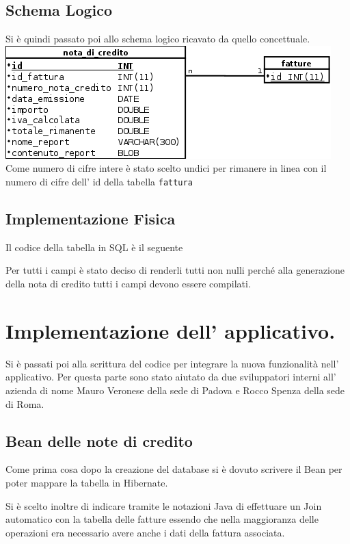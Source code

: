 \documentclass[12pt]{book}
\begin{document}
\subsection{Schema Logico}
Si è quindi passato poi allo schema logico ricavato da quello concettuale.
\newline
\newline
\includegraphics[scale=0.5]{img/schema_logico}
\newline
Come numero di cifre intere è stato scelto undici per rimanere in linea con il
numero di cifre dell' id della tabella \texttt{fattura}
\subsection{Implementazione Fisica}
Il codice della tabella in SQL è il seguente

Per tutti i campi è stato deciso di renderli tutti non nulli perché alla
generazione della nota di credito tutti i campi devono essere compilati.
\section{Implementazione dell' applicativo.}
Si è passati poi alla scrittura del codice per integrare la nuova funzionalità
nell' applicativo.
Per questa parte sono stato aiutato da due sviluppatori interni all' azienda
di nome Mauro Veronese della sede di Padova e Rocco Spenza della sede di Roma.
\subsection{Bean delle note di credito}
Come prima cosa dopo la creazione del database si è dovuto scrivere il Bean per 
poter mappare la tabella in Hibernate.

Si è scelto inoltre di indicare tramite le notazioni Java di effettuare un Join
automatico con la tabella delle fatture essendo che nella maggioranza delle 
operazioni era necessario avere anche i dati della fattura associata.
\end{document}
